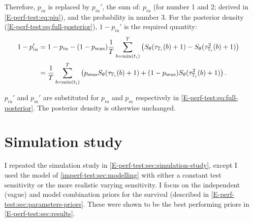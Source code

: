 \documentclass[thesis.tex]{subfiles}
\begin{document}
Therefore, $p_{iu}$ is replaced by $p_{iu}'$, the sum of: $p_{iu}$ (for number 1 and 2; derived in \cref{E-perf-test:eq:piu}), and the probability in number 3.
For the posterior density (\cref{E-perf-test:eq:full-posterior}), $1 - p_{iu}'$ is the required quantity:
\begin{align}
1 - p_{iu}'
&= 1 - p_{iu} - (1 - p_\text{sens})\frac{1}{T} \sum_{b=\min(t_i)}^T \left( S_\theta(\tau_{\mathbb{T}_i}(b) + 1) - S_\theta(\tau^2_{\mathbb{T}_i}(b) + 1) \right) \\
&= \frac{1}{T} \sum_{b=\min(t_i)}^T \left( p_\text{sens} S_\theta(\tau_{\mathbb{T}_i}(b) + 1) + (1 - p_\text{sens}) S_\theta(\tau^2_{\mathbb{T}_i}(b) + 1)\right).
\label{imperf-test:eq:pit-prime}
\end{align}

$p_{iu}'$ and $p_{ia}'$ are substituted for $p_{iu}$ and $p_{ia}$ respectively in \cref{E-perf-test:eq:full-posterior}.
The posterior density is otherwise unchanged.

\section{Simulation study} \label{imperf-test:sec:sim-study-results}

I repeated the simulation study in \cref{E-perf-test:sec:simulation-study}, except I used the model of \cref{imperf-test:sec:modelling} with either a constant test sensitivity or the more realistic varying sensitivity.
I focus on the independent (vague) and model combination priors for the survival (described in \cref{E-perf-test:sec:parameters-priors}.
These were shown to be the best performing priors in \cref{E-perf-test:sec:results}.
\end{document}
